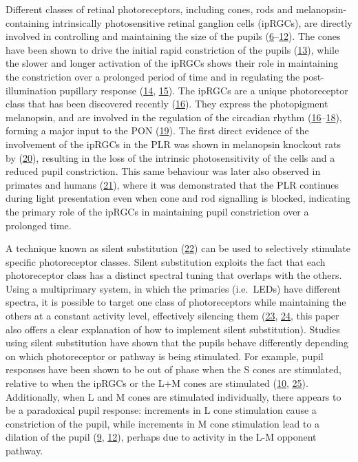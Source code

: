 \documentclass[
]{article}
\begin{document}
Different classes of retinal photoreceptors, including cones, rods and melanopsin-containing intrinsically photosensitive retinal ganglion cells (ipRGCs), are directly involved in controlling and maintaining the size of the pupils (\protect\hyperlink{ref-Barrionuevo2014}{6}--\protect\hyperlink{ref-Woelders2018}{12}). The cones have been shown to drive the initial rapid constriction of the pupils (\protect\hyperlink{ref-Mathot2018}{13}), while the slower and longer activation of the ipRGCs shows their role in maintaining the constriction over a prolonged period of time and in regulating the post-illumination pupillary response (\protect\hyperlink{ref-Markwell2010}{14}, \protect\hyperlink{ref-McDougal2010}{15}). The ipRGCs are a unique photoreceptor class that has been discovered recently (\protect\hyperlink{ref-Provencio2000}{16}). They express the photopigment melanopsin, and are involved in the regulation of the circadian rhythm (\protect\hyperlink{ref-Provencio2000}{16}--\protect\hyperlink{ref-Ruby2002}{18}), forming a major input to the PON (\protect\hyperlink{ref-Dacey2003}{19}). The first direct evidence of the involvement of the ipRGCs in the PLR was shown in melanopsin knockout rats by (\protect\hyperlink{ref-Lucas2003}{20}), resulting in the loss of the intrinsic photosensitivity of the cells and a reduced pupil constriction. This same behaviour was later also observed in primates and humans (\protect\hyperlink{ref-Gamlin2007}{21}), where it was demonstrated that the PLR continues during light presentation even when cone and rod signalling is blocked, indicating the primary role of the ipRGCs in maintaining pupil constriction over a prolonged time.

A technique known as silent substitution (\protect\hyperlink{ref-Estevez1982}{22}) can be used to selectively stimulate specific photoreceptor classes. Silent substitution exploits the fact that each photoreceptor class has a distinct spectral tuning that overlaps with the others. Using a multiprimary system, in which the primaries (i.e.~LEDs) have different spectra, it is possible to target one class of photoreceptors while maintaining the others at a constant activity level, effectively silencing them (\protect\hyperlink{ref-Shapiro1996}{23}, \protect\hyperlink{ref-Spitschan2018}{24}, this paper also offers a clear explanation of how to implement silent substitution). Studies using silent substitution have shown that the pupils behave differently depending on which photoreceptor or pathway is being stimulated. For example, pupil responses have been shown to be out of phase when the S cones are stimulated, relative to when the ipRGCs or the L+M cones are stimulated (\protect\hyperlink{ref-Spitschan2014}{10}, \protect\hyperlink{ref-Cao2015}{25}). Additionally, when L and M cones are stimulated individually, there appears to be a paradoxical pupil response: increments in L cone stimulation cause a constriction of the pupil, while increments in M cone stimulation lead to a dilation of the pupil (\protect\hyperlink{ref-Murray2018}{9}, \protect\hyperlink{ref-Woelders2018}{12}), perhaps due to activity in the L-M opponent pathway.
\end{document}

